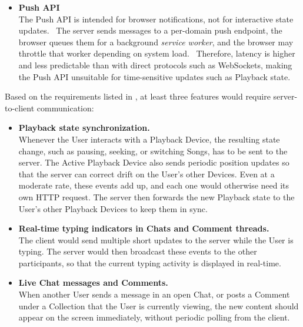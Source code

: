 \begin{itemize}
    \item \textbf{Push API} \\
    The Push API is intended for browser notifications, not for interactive
    state updates.~\parencite{pushapi}
    The server sends messages to a per-domain push endpoint, the browser
    queues them for a background \textit{service worker}, and the browser may
    throttle that worker depending on system load.~\parencite{http_push, service_workers_mdn}
    Therefore, latency is higher and less predictable than with direct
    protocols such as WebSockets, making the Push API unsuitable for
    time-sensitive updates such as Playback state.~\parencite{pushapi}
\end{itemize}

Based on the requirements listed in , at least three features
would require server-to-client communication:
\begin{itemize}
    \item \textbf{Playback state synchronization.}\\
    Whenever the User interacts with a Playback Device, the resulting state
    change, such as pausing, seeking, or switching Songs, has to be sent to
    the server. The Active Playback Device also sends periodic position
    updates so that the server can correct drift on the User's other Devices.
    Even at a moderate rate, these events add up, and each one would otherwise need its own
    HTTP request.
    The server then forwards the new Playback state to the User's other Playback Devices to
    keep them in sync.

    \item \textbf{Real-time typing indicators in Chats and Comment threads.}\\
    The client would send multiple short updates to the server while the User is typing.
    The server would then broadcast these events to the other participants, so that the current
    typing activity is displayed in real-time.

    \item \textbf{Live Chat messages and Comments.}\\
    When another User sends a message in an open Chat, or posts a Comment under a Collection
    that the User is currently viewing, the new content should appear on the screen immediately,
    without periodic polling from the client.
\end{itemize}

